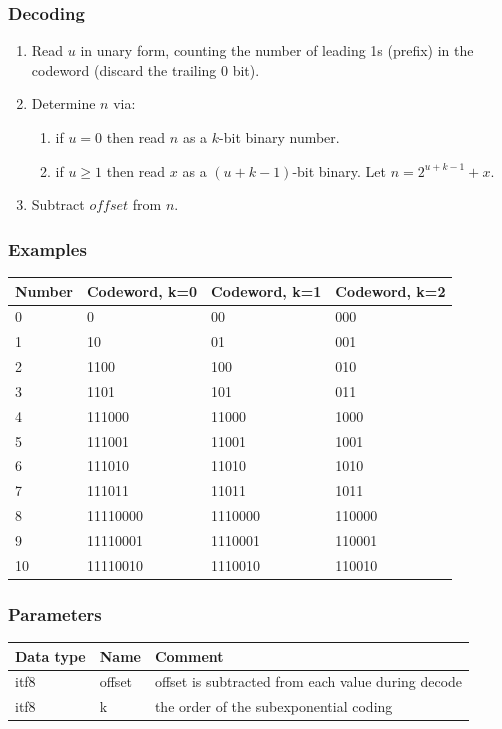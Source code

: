 \documentclass[a4paper]{article}
\begin{document}
\subsubsection*{Decoding}

\begin{enumerate}
\item Read $u$ in unary form, counting the number of leading 1s (prefix) in the codeword (discard the trailing 0 bit).

\item Determine $n$ via:
\begin{enumerate}
\item if $u = 0$ then read $n$ as a $k$-bit binary number.
\item if $u \ge 1$ then read $x$ as a $(u + k - 1)$-bit binary. Let $n = 2^{u+k-1} + x$.
\end{enumerate}

\item Subtract $\mathit{offset}$ from $n$.
\end{enumerate}

\subsubsection*{Examples}

\begin{tabular}{|>{\raggedright}p{105pt}|>{\raggedright}p{105pt}|>{\raggedright}p{105pt}|>{\raggedright}p{105pt}|}
\hline
\textbf{Number} & \textbf{Codeword, k=0} & \textbf{Codeword, k=1} & \textbf{Codeword, 
k=2}\tabularnewline
\hline
0 & 0 & 00 & 000\tabularnewline
\hline
1 & 10 & 01 & 001\tabularnewline
\hline
2 & 1100 & 100 & 010\tabularnewline
\hline
3 & 1101 & 101 & 011\tabularnewline
\hline
4 & 111000 & 11000 & 1000\tabularnewline
\hline
5 & 111001 & 11001 & 1001\tabularnewline
\hline
6 & 111010 & 11010 & 1010\tabularnewline
\hline
7 & 111011 & 11011 & 1011\tabularnewline
\hline
8 & 11110000 & 1110000 & 110000\tabularnewline
\hline
9 & 11110001 & 1110001 & 110001\tabularnewline
\hline
10 & 11110010 & 1110010 & 110010\tabularnewline
\hline
\end{tabular}

\subsubsection*{Parameters}

\begin{tabular}{|>{\raggedright}p{100pt}|>{\raggedright}p{100pt}|>{\raggedright}p{230pt}|}
\hline
\textbf{Data type} & \textbf{Name} & \textbf{Comment}
\tabularnewline
\hline
itf8 & offset & offset is subtracted from each value during decode\tabularnewline
\hline
itf8 & k & the order of the subexponential coding\tabularnewline
\hline
\end{tabular}
\end{document}
